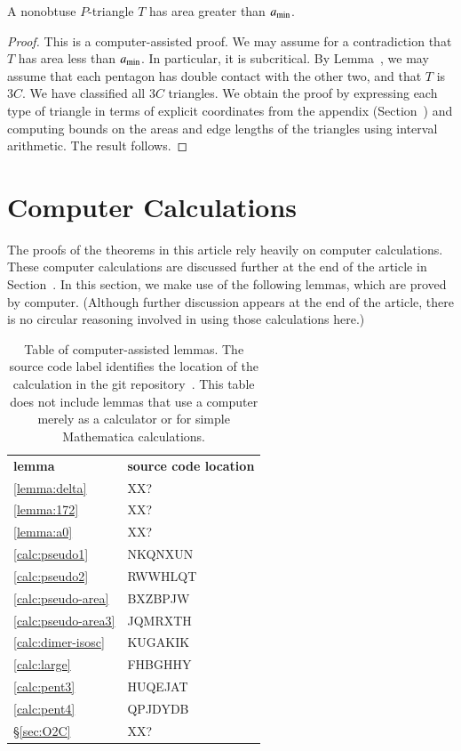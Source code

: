 \begin{lemma}  
A nonobtuse $P$-triangle $T$ has area greater than $a_\text{min}$.
\end{lemma}

\begin{proof} 
  This is a computer-assisted proof.  We may assume for a contradiction
  that $T$ has area less than $a_\text{min}$.  In particular, it is
  subcritical.  By Lemma~, we may assume that each
  pentagon has double contact with the other two, and that $T$ is
  $3C$.  We have classified all $3C$ triangles.  We obtain the proof
  by expressing each type of triangle in terms of explicit
  coordinates from the appendix (Section~) and
  computing bounds on the areas and edge lengths of the triangles
  using interval arithmetic.  The result follows.
\end{proof}

\section{Computer Calculations}

The proofs of the theorems in this article rely heavily on computer
calculations.  These computer calculations are discussed further at
the end of the article in Section~.  In this section,
we make use of the following lemmas, which are proved by computer.
(Although further discussion appears at the end of the article, there
is no circular reasoning involved in using those calculations here.)


\begin{table}[htbp]
\centering
\caption{Table of computer-assisted lemmas.  The source code label
identifies the location of the calculation in the git repository~\cite{Git}.
This table does not include lemmas that use a computer merely as a calculator
or for simple Mathematica calculations.}
\label{tab:computer-assisted}
\begin{tabular}{ll}
{\bf lemma} & {\bf source code location} \\
\ref{lemma:delta} & XX? \\
\ref{lemma:172} & XX? \\
\ref{lemma:a0} & XX? \\
\ref{calc:pseudo1} & NKQNXUN \\
\ref{calc:pseudo2} & RWWHLQT\\
\ref{calc:pseudo-area} & BXZBPJW\\
 \ref{calc:pseudo-area3} & JQMRXTH \\
\ref{calc:dimer-isosc} & KUGAKIK \\
\ref{calc:large} & FHBGHHY \\
\ref{calc:pent3} & HUQEJAT \\
\ref{calc:pent4} & QPJDYDB \\
\S\ref{sec:O2C} & XX?
\end{tabular}
\end{table}


